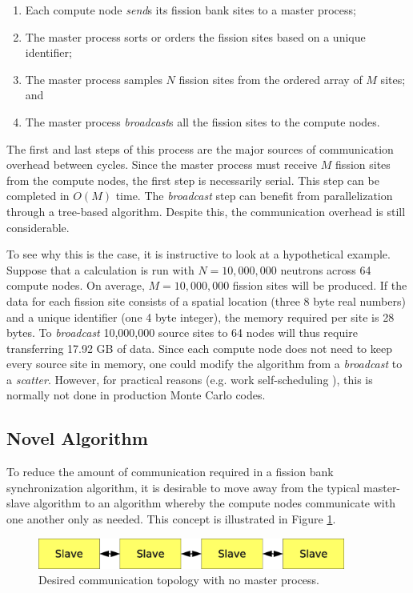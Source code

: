 \begin{enumerate}
\item Each compute node \emph{send}s its fission bank sites to a
  master process;
\item The master process sorts or orders \cite{brown-sort} the fission
  sites based on a unique identifier;
\item The master process samples $N$ fission sites from the ordered
  array of $M$ sites; and
\item The master process \emph{broadcast}s all the fission sites to
  the compute nodes.
\end{enumerate}

The first and last steps of this process are the major sources of
communication overhead between cycles. Since the master process must
receive $M$ fission sites from the compute nodes, the first step is
necessarily serial. This step can be completed in $O(M)$ time. The
\emph{broadcast} step can benefit from parallelization through a
tree-based algorithm. Despite this, the communication overhead is
still considerable.

To see why this is the case, it is instructive to look at a
hypothetical example. Suppose that a calculation is run with $N =
10,000,000$ neutrons across 64 compute nodes. On average, $M =
10,000,000$ fission sites will be produced. If the data for each
fission site consists of a spatial location (three 8 byte real
numbers) and a unique identifier (one 4 byte integer), the memory
required per site is 28 bytes. To \emph{broadcast} 10,000,000 source
sites to 64 nodes will thus require transferring 17.92 GB of data.
Since each compute node does not need to keep every source site in
memory, one could modify the algorithm from a \emph{broadcast} to a
\emph{scatter}. However, for practical reasons (e.g. work
self-scheduling \cite{brown-lectures}), this is normally not done in
production Monte Carlo codes.

\subsection{Novel Algorithm}
\label{sec:algorithm}

To reduce the amount of communication required in a fission bank
synchronization algorithm, it is desirable to move away from the
typical master-slave algorithm to an algorithm whereby the compute
nodes communicate with one another only as needed. This concept is
illustrated in Figure \ref{fig:slave-only}.
\begin{figure}[ht]
  \centering
  \includegraphics[width=0.9\textwidth]{figures/master-slave/slave-only.eps}
  \caption{Desired communication topology with no master process.}
  \label{fig:slave-only}
\end{figure}

